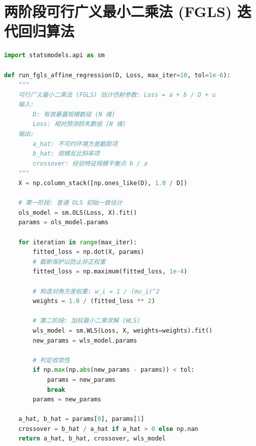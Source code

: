 \section{两阶段可行广义最小二乘法 (FGLS) 迭代回归算法}\label{app:code_fgls}
\begin{lstlisting}[language=Python, caption={基于残差平方倒数加权的两阶段 FGLS 回归算法}]
import statsmodels.api as sm

def run_fgls_affine_regression(D, Loss, max_iter=10, tol=1e-6):
    """
    可行广义最小二乘法 (FGLS) 估计仿射参数: Loss = a + b / D + u
    输入:
        D: 有效暴露规模数组 (N 维)
        Loss: 相对预测损失数组 (N 维)
    输出:
        a_hat: 不可约环境方差截距项
        b_hat: 规模反比斜率项
        crossover: 经验特征规模平衡点 b / a
    """
    X = np.column_stack([np.ones_like(D), 1.0 / D])
    
    # 第一阶段: 普通 OLS 初始一致估计
    ols_model = sm.OLS(Loss, X).fit()
    params = ols_model.params
    
    for iteration in range(max_iter):
        fitted_loss = np.dot(X, params)
        # 截断保护以防止非正权重
        fitted_loss = np.maximum(fitted_loss, 1e-4)
        
        # 构造对角方差权重: w_i = 1 / (mu_i)^2
        weights = 1.0 / (fitted_loss ** 2)
        
        # 第二阶段: 加权最小二乘求解 (WLS)
        wls_model = sm.WLS(Loss, X, weights=weights).fit()
        new_params = wls_model.params
        
        # 判定收敛性
        if np.max(np.abs(new_params - params)) < tol:
            params = new_params
            break
        params = new_params
        
    a_hat, b_hat = params[0], params[1]
    crossover = b_hat / a_hat if a_hat > 0 else np.nan
    return a_hat, b_hat, crossover, wls_model
\end{lstlisting}

